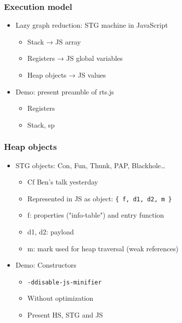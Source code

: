 \documentclass[aspectratio=169]{beamer}
\begin{document}
\begin{frame}
\frametitle{Execution model}
  \begin{itemize}
    \item Lazy graph reduction: STG machine in JavaScript
      \begin{itemize}
    \item Stack → JS array
    \item Registers → JS global variables
    \item Heap objects  → JS values
      \end{itemize}
    \item Demo: present preamble of rts.js
      \begin{itemize}
        \item Registers
        \item Stack, sp
      \end{itemize}
    \end{itemize}
\end{frame}

\begin{frame}
\frametitle{Heap objects}
  \begin{itemize}
    \item STG objects: Con, Fun, Thunk, PAP, Blackhole…
      \begin{itemize}
        \item Cf Ben's talk yesterday
        \item Represented in JS as object: \texttt{\{ f, d1, d2, m \}}
        \item f: properties ("info-table") and entry
          function
        \item d1, d2: payload
        \item m: mark used for heap traversal (weak references)
      \end{itemize}
    \item Demo: Constructors
      \begin{itemize}
        \item \texttt{-ddisable-js-minifier}
        \item Without optimization
        \item Present HS, STG and JS
      \end{itemize}
  \end{itemize}
\end{frame}
\end{document}
